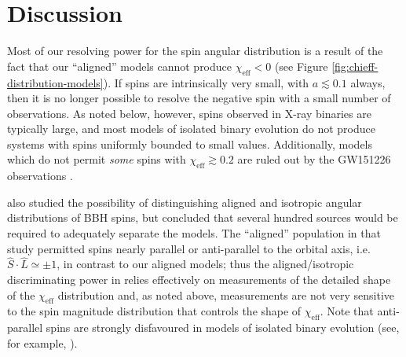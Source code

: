 \documentclass[modern,linenumbers]{aastex61}
\newcommand{\chieff}{\chi_\mathrm{eff}}
\begin{document}
\section{Discussion}
\label{sec:discussion}

Most of our resolving power for the spin angular distribution is a
result of the fact that our ``aligned'' models cannot produce
$\chieff < 0$ (see Figure \ref{fig:chieff-distribution-models}).  If
spins are intrinsically very small, with $a \lesssim 0.1$ always, then
it is no longer possible to resolve the negative spin with a small
number of observations.  As noted below, however, spins observed in
X-ray binaries are typically large, and most models of isolated binary
evolution do not produce systems with spins uniformly bounded to small
values.  Additionally, models which do not permit \emph{some} spins
with $\chieff \gtrsim 0.2$ are ruled out by the GW151226 observations
\citep{2016PhRvL.116x1103A}.

\citet{2017CQGra..34cLT01V} also studied the possibility of
distinguishing aligned and isotropic angular distributions of \ac{BBH}
spins, but concluded that several hundred sources would be required to
adequately separate the models.  The ``aligned'' population in that
study permitted spins nearly parallel or anti-parallel to the orbital
axis, i.e.\ $\hat{S}\cdot \hat{L} \simeq \pm 1$, in contrast to our
aligned models; thus the aligned/isotropic discriminating power in
\citet{2017CQGra..34cLT01V} relies effectively on measurements of the
detailed shape of the $\chieff$ distribution and, as noted above,
measurements are not very sensitive to the spin magnitude distribution
that controls the shape of $\chieff$.  Note that anti-parallel spins
are strongly disfavoured in models of isolated binary evolution (see,
for example, \citet{Kalogera:2000}).
\end{document}
